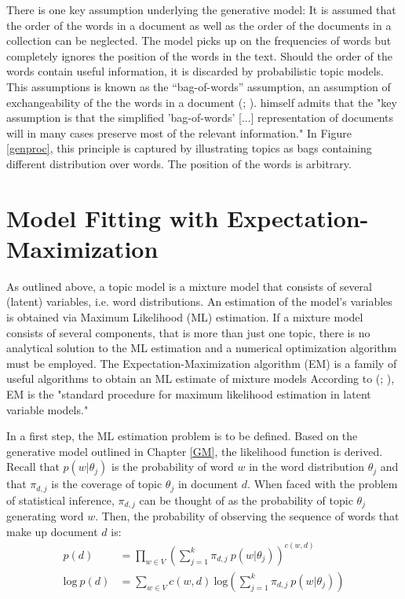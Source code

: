 \documentclass[11pt,a4paper,english,oneside]{book}
\numberwithin{equation}{chapter}
\begin{document}
There is one key assumption underlying the generative model: It is assumed that the order of the words in a document as well as the order of the documents in a collection can be neglected. The model picks up on the frequencies of words but completely ignores the position of the words in the text. Should the order of the words contain useful information, it is discarded by probabilistic topic models. This assumptions is known as the “bag-of-words” assumption, an assumption of exchangeability of the the words in a document (\citealt[p.~994]{Blei.2003}; \citealt[~p. 3]{Steyvers(2007)}). \citet[~p. 290]{Hofmann.1999} himself admits that the "key assumption is that the simplified 'bag-of-words' [...] representation of documents will in many cases preserve most of the relevant information." In Figure \ref{genproc}, this principle is captured by illustrating topics as bags containing different distribution over words. The position of the words is arbitrary.
 
\section{Model Fitting with Expectation-Maximization}\label{Ch:model}

As outlined above, a topic model is a mixture model that consists of several (latent) variables, i.e. word distributions. An estimation of the model's variables is obtained via Maximum Likelihood (ML) estimation. If a mixture model consists of several components, that is more than just one topic, there is no analytical solution to the ML estimation and a numerical optimization algorithm must be employed. The Expectation-Maximization algorithm (EM) is a family of useful algorithms to obtain an ML estimate of mixture models \cite[~p. 359]{Zhai.2016} According to \citeauthor{Hofmann.1999} (\citeyear[p. 290]{Hofmann.1999}; \citeyear[p. 181]{Hofmann.2001}), EM is the "standard procedure for maximum likelihood estimation in latent variable models." 

In a first step, the ML estimation problem is to be defined. Based on the generative model outlined in Chapter \ref{GM}, the likelihood function is derived. Recall that $p(w | \theta_j)$ is the probability of word $w$ in the word distribution $\theta_j$ and that $\pi_{d,j}$ is the coverage of topic $\theta_j$ in document $d$. When faced with the problem of statistical inference, $\pi_{d,j}$ can be thought of as the probability of topic $\theta_j$ generating word $w$. Then, the probability of observing the sequence of words that make up document $d$ is:
\begin{align}
\label{prob} p(d) &= \underset{w \in V}\prod \left( \sum_{j=1}^{k}\pi_{d,j} \ p(w|\theta_j) \right)^{c(w,d)}\\
\label{log} \text{log} \ p(d) &= \underset{w \in V}\sum c(w,d) \ \text{log} \left( \sum_{j=1}^{k}\pi_{d,j} \ p(w|\theta_j) \right)
\end{align}
\end{document}

